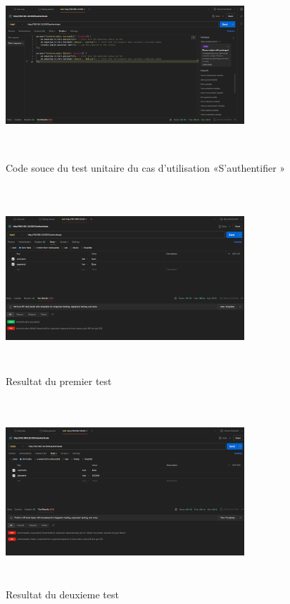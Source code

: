 \begin{figure}[ht!]
  \centering
  \includegraphics[width=0.8\textwidth, height=7cm]{chap3.images/code source test.png}
  \caption{ Code souce du test unitaire du cas d’utilisation «S’authentifier » }

\end{figure}


\begin{figure}[ht!]
  \centering
  \includegraphics[width=0.8\textwidth, height=7cm]{chap3.images/cas1.png}
  \caption{ Resultat du premier test }

\end{figure}

\begin{figure}[ht!]
  \centering
  \includegraphics[width=0.8\textwidth, height=7cm]{chap3.images/cas2.png}
  \caption{ Resultat du deuxieme test }

\end{figure}
\newpage
